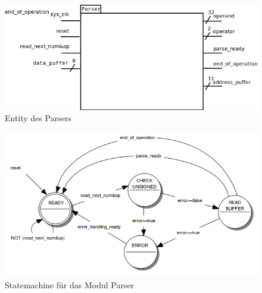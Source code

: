 \begin{figure}[!ht]
	\centering
	\includegraphics[scale=0.5]{figures/entity_parser.png} 
	\caption{Entity des Parsers}
	\label{fig:entity_parser}
\end{figure}

\begin{figure}[!ht]
	\centering
	\includegraphics[scale=0.5]{figures/parser.png} 
	\caption{Statemachine für das Modul Parser}
	\label{fig:parser}
\end{figure}

